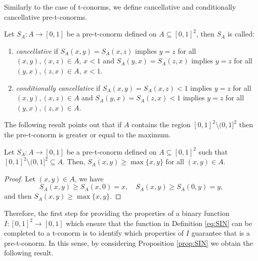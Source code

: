 Similarly to the case of t-conorms, we define cancellative and conditionally cancellative pre-t-conorms.

\begin{definition}\label{def:pre-t-conorm:cancellative} Let $S_A:A \to [0,1]$  be a pre-t-conorm defined on $A\subseteq [0,1]^2$, then $S_A$ is called:
	\begin{enumerate}[label=(\alph*)]
		\item \emph{cancellative} if $S_A(x,y)=S_A(x,z)$  implies $y=z$ for all $(x,y),(x,z) \in A$, $x<1$ and  $S_A(y,x)=S_A(z,x)$ implies $y=z$ for all $(y,x),(z,x) \in A$, $x<1$.
		\item \emph{conditionally cancellative} if $S_A(x,y)=S_A(x,z)<1$ implies $y=z$ for all $(x,y),(x,z) \in A$ and $S_A(y,x)=S_A(z,x)<1$ implies $y=z$ for all $(y,x),(z,x) \in A$.
	\end{enumerate}
\end{definition}

The following result points out that if $A$ contains the region $[0,1]^2 \setminus (0,1]^2$ then the pre-t-conorm is  greater or equal to the maximum.
\begin{proposition}\label{prop:pre-t-conorm-maximum} Let $S_A: A \to [0,1]$ be a pre-t-conorm defined on $A\subseteq [0,1]^2$ such that $[0,1]^2 \setminus (0,1]^2 \subseteq A$. Then, $S_A(x,y) \geq \max \{x,y\}$ for all $(x,y) \in A$.
\end{proposition}
\begin{proof}
	Let $(x,y) \in A$, we have
	$$S_A(x,y) \geq S_A(x,0) =x, \quad S_A(x,y) \geq S_A(0,y) =y,$$
	and then $S_A(x,y) \geq \max \{x,y\}$.
\end{proof}

Therefore, the first step for providing the properties of a binary function $I:[0,1]^2 \to [0,1]$ which ensure that the function \SIN in Definition \ref{eq:SIN} can be completed to a t-conorm is to identify which properties of $I$ guarantee that \SIN is a pre-t-conorm. In this sense, by considering Proposition \ref{prop:SIN} we obtain the following result.

